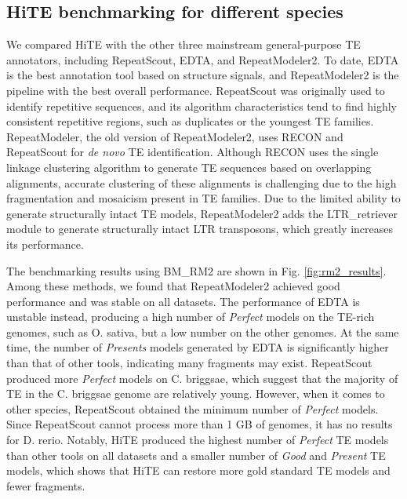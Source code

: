 \documentclass{bmcart}
\begin{document}
\subsection*{HiTE benchmarking for different species}
We compared HiTE with the other three mainstream general-purpose TE annotators, including RepeatScout, EDTA, and RepeatModeler2. To date, EDTA is the best annotation tool based on structure signals, and RepeatModeler2 is the pipeline with the best overall performance. RepeatScout was originally used to identify repetitive sequences, and its algorithm characteristics tend to find highly consistent repetitive regions, such as duplicates or the youngest TE families. %
RepeatModeler, the old version of RepeatModeler2, uses RECON and RepeatScout for \emph{de novo} TE identification. Although RECON uses the single linkage clustering algorithm to generate TE sequences based on overlapping alignments, accurate clustering of these alignments is challenging due to the high fragmentation and mosaicism present in TE families\cite{storer2022methodologies}. Due to the limited ability to generate structurally intact TE models, RepeatModeler2 adds the LTR\_retriever module to generate structurally intact LTR transposons, which greatly increases its performance\cite{flynn2020repeatmodeler2}.

The benchmarking results using BM\_RM2 are shown in Fig. \ref{fig:rm2_results}. Among these methods, we found that RepeatModeler2 achieved good performance and was stable on all datasets. The performance of EDTA is unstable instead, producing a high number of \emph{Perfect} models on the TE-rich genomes, such as O. sativa, but a low number on the other genomes. At the same time, the number of \emph{Presents} models generated by EDTA is significantly higher than that of other tools, indicating many fragments may exist. RepeatScout produced more \emph{Perfect} models on C. briggsae, which suggest that the majority of TE in the C. briggsae genome are relatively young. However, when it comes to other species, RepeatScout obtained the minimum number of \emph{Perfect} models. Since RepeatScout cannot process more than 1 GB of genomes, it has no results for D. rerio. Notably, HiTE produced the highest number of \emph{Perfect} TE models than other tools on all datasets and a smaller number of \emph{Good} and \emph{Present} TE models, which shows that HiTE can restore more gold standard TE models and fewer fragments. %
\end{document}
